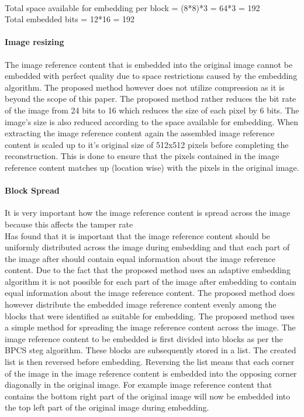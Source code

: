 \documentclass[12pt]{article}
\begin{document}
\hspace{0pt} \\
Total space available for embedding per block = (8*8)*3 = 64*3 = 192
\hspace{0pt} \\
Total embedded bits = 12*16 = 192

\paragraph{Image resizing}
\label{ImageCompression}
The image reference content that is embedded into the original image cannot be embedded with perfect quality due to space restrictions caused by the embedding algorithm. 
The proposed method however does not utilize compression as it is beyond the scope of this paper.
The proposed method rather reduces the bit rate of the image from 24 bits to 16 which reduces the size of each pixel by 6 bits.
The image's size is also reduced according to the space available for embedding.
When extracting the image reference content again the assembled image reference content is scaled up to it's original size of 512x512 pixels before completing the reconstruction.
This is done to ensure that the pixels contained in the image reference content matches up (location wise) with the pixels in the original image.

\paragraph{Block Spread}
It is very important how the image reference content is spread across the image because this affects the tamper rate
\hspace{0pt} \\
\cite{korus2013efficient} Has found that it is important that the image reference content should be uniformly distributed across the image during embedding and that each part of the image after should contain equal information about the image reference content.
Due to the fact that the proposed method uses an adaptive embedding algorithm it is not possible for each part of the image after embedding to contain equal information about the image reference content.
The proposed method does however distribute the embedded image reference content evenly among the blocks that were identified as suitable for embedding.
The proposed method uses a simple method for spreading the image reference content across the image.
The image reference content to be embedded is first divided into blocks as per the BPCS steg algorithm.
These blocks are subsequently stored in a list. 
The created list is then reversed before embedding.
Reversing the list means that each corner of the image in the image reference content is embedded into the opposing corner diagonally in the original image. For example image reference content that contains the bottom right part of the original image will now be embedded into the top left part of the original image during embedding.
\end{document}
